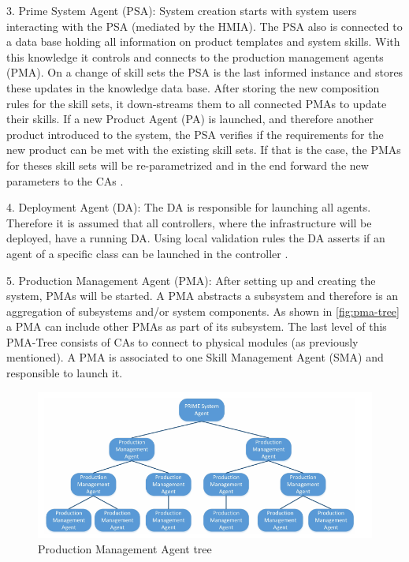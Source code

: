 \documentclass[conference,compsoc,hidelinks]{IEEEtran}
\begin{document}
3. Prime System Agent (PSA): System creation starts with system users interacting with the PSA (mediated by the HMIA). The PSA also is connected to a data base holding all information on product templates and system skills. With this knowledge it controls and connects to the production management agents (PMA). On a change of skill sets the PSA is the last informed instance and stores these updates in the knowledge data base. After storing the new composition rules for the skill sets, it down-streams them to all connected PMAs to update their skills. If a new Product Agent (PA) is launched, and therefore another product introduced to the system, the PSA verifies if the requirements for the new product can be met with the existing skill sets. If that is the case, the PMAs for theses skill sets will be re-parametrized and in the end forward the new parameters to the CAs \cite{Hybrid}.

4. Deployment Agent (DA): The DA is responsible for launching all agents. Therefore it is assumed that all controllers, where the infrastructure will be deployed, have a running DA. Using local validation rules the DA asserts if an agent of a specific class can be launched in the controller \cite{Hybrid}. 

5. Production Management Agent (PMA): After setting up and creating the system, PMAs will be started. A PMA abstracts a subsystem and therefore is an aggregation of subsystems and/or system components. As shown in \autoref{fig:pma-tree} a PMA can include other PMAs as part of its subsystem. The last level of this PMA-Tree consists of CAs to connect to physical modules (as previously mentioned).  A PMA is associated to one Skill Management Agent (SMA) and responsible to launch it. 

\begin{figure}[ht]
	\includegraphics[width=\columnwidth]{img/Production-Management-Agent-Tree.png}
	\caption{Production Management Agent tree \cite{Hybrid}}
	\label{fig:pma-tree}
\end{figure}
\end{document}
